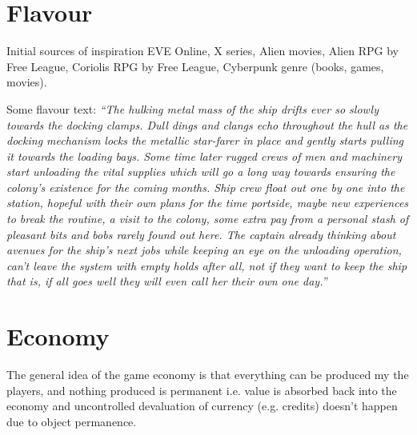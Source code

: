 \documentclass[a4paper,10pt]{article}
\begin{document}
\section{Flavour}
\begin{multicols}{2}
Initial sources of inspiration EVE Online, X series, Alien movies, Alien
RPG by Free League, Coriolis RPG by Free League, Cyberpunk genre (books,
games, movies).

Some flavour text: \textit{``The hulking metal mass of the ship drifts ever so
slowly towards the docking clamps. Dull dings and clangs echo throughout the
hull as the docking mechanism locks the metallic star-farer in place and gently
starts pulling it towards the loading bays. Some time later rugged crews of men
and machinery start unloading the vital supplies which will go a long way
towards ensuring the colony's existence for the coming months. Ship crew float
out one by one into the station, hopeful with their own plans for the time
portside, maybe new experiences to break the routine, a visit to the colony,
some extra pay from a personal stash of pleasant bits and bobs rarely found out
here. The captain already thinking about avenues for the ship's next jobs while
keeping an eye on the unloading operation, can't leave the system with empty
holds after all, not if they want to keep the ship that is, if all goes well
they will even call her their own one day.''}

\end{multicols}

\section{Economy}
\begin{multicols}{2}
The general idea of the game economy is that everything can be produced my the
players, and nothing produced is permanent i.e. value is absorbed back into the
economy and uncontrolled devaluation of currency (e.g. credits) doesn't happen
due to object permanence.
\end{multicols}
\end{document}
